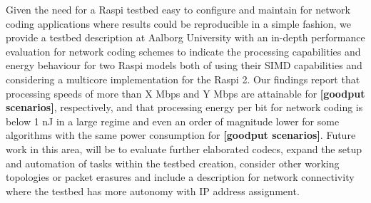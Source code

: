 \label{sec:conclusions}
Given the need for a \ac{Raspi} testbed easy to configure and maintain
for network coding applications where results could be reproducible
in a simple fashion, we provide a testbed description at Aalborg
University with an in-depth performance evaluation for network coding
schemes to indicate the processing capabilities and energy behaviour
for two \ac{Raspi} models both of using their \ac{SIMD} capabilities
and considering a multicore implementation for the \ac{Raspi} 2. Our
findings report that processing speeds of more than X Mbps and Y Mbps are attainable for \textbf{[goodput scenarios]}, respectively, and that
processing energy per bit for network coding is below 1 nJ in a large regime
and even an order of magnitude lower for some algorithms with the same power consumption for \textbf{[goodput scenarios]}. Future work in this area,
will be to evaluate further elaborated codecs, expand the setup and
automation of tasks within the testbed creation, consider other working
topologies or packet erasures and include a description for network
connectivity where the testbed has more autonomy with \ac{IP} address assignment.